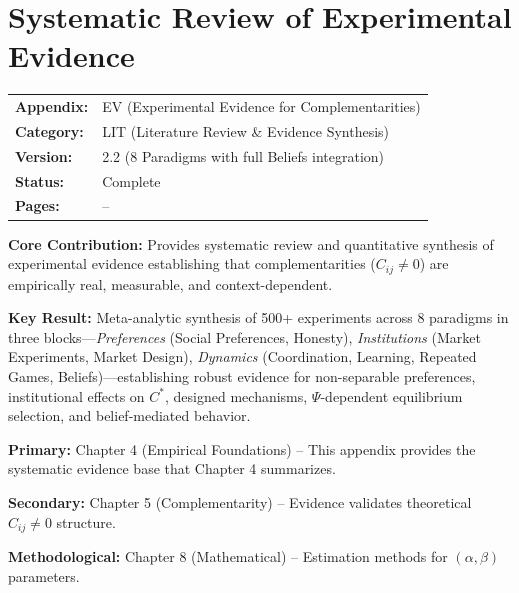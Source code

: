 \section{Systematic Review of Experimental Evidence}
\label{app:experimental-evidence}


\begin{tcolorbox}[colback=blue!5!white, colframe=blue!75!black,
    title=\textbf{Appendix EXP: LIT-EVIDENCE}]

\begin{tabular}{@{}ll@{}}
\textbf{Appendix:} & EV (Experimental Evidence for Complementarities) \\
\textbf{Category:} & LIT (Literature Review \& Evidence Synthesis) \\
\textbf{Version:} & 2.2 (8 Paradigms with full Beliefs integration) \\
\textbf{Status:} & Complete \\
\textbf{Pages:} & \pageref{app:experimental-evidence}--\pageref{sec:EV-footer} \\
\end{tabular}

\tcblower

\textbf{Core Contribution:} Provides systematic review and quantitative synthesis
of experimental evidence establishing that complementarities ($C_{ij} \neq 0$)
are empirically real, measurable, and context-dependent.

\textbf{Key Result:} Meta-analytic synthesis of 500+ experiments across 8
paradigms in three blocks---\emph{Preferences} (Social Preferences, Honesty),
\emph{Institutions} (Market Experiments, Market Design), \emph{Dynamics}
(Coordination, Learning, Repeated Games, Beliefs)---establishing robust evidence for
non-separable preferences, institutional effects on $C^*$, designed mechanisms,
$\Psi$-dependent equilibrium selection, and belief-mediated behavior.

\end{tcolorbox}


\begin{tcolorbox}[colback=gray!10!white, colframe=gray!75!black,
    title=\textbf{Chapter Linkage}]

\textbf{Primary:} Chapter 4 (Empirical Foundations) -- This appendix provides
the systematic evidence base that Chapter 4 summarizes.

\textbf{Secondary:} Chapter 5 (Complementarity) -- Evidence validates theoretical
$C_{ij} \neq 0$ structure.

\textbf{Methodological:} Chapter 8 (Mathematical) -- Estimation methods for
$(\alpha, \beta)$ parameters.

\end{tcolorbox}

